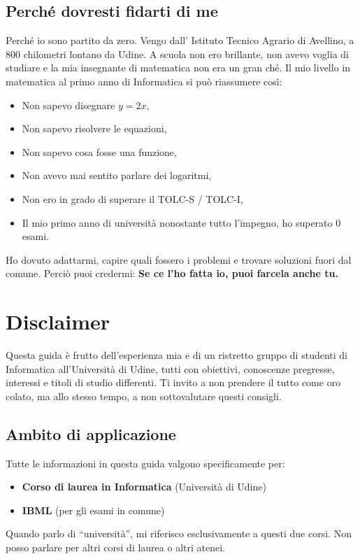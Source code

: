 \documentclass[18pt]{extarticle}
\begin{document}
\subsection{Perché dovresti fidarti di me}
Perché io sono partito da zero.  
Vengo dall' Istituto Tecnico Agrario di Avellino, a 800 chilometri lontano da Udine. 
A scuola non ero brillante, non avevo voglia di studiare e la mia insegnante di matematica non era un gran ché.  
Il mio livello in matematica al primo anno di Informatica si può riassumere così:
\begin{itemize}
\item Non sapevo disegnare $y = 2x$,
\item Non sapevo risolvere le equazioni,
\item Non sapevo cosa fosse una funzione,
\item Non avevo mai sentito parlare dei logaritmi,
\item Non ero in grado di superare il TOLC-S / TOLC-I, 
\item Il mio primo anno di università nonostante tutto l'impegno, ho superato 0 esami. 
\end{itemize}%
Ho dovuto adattarmi, capire quali fossero i problemi e trovare soluzioni fuori dal comune. 
Perciò puoi credermi: \textbf{Se ce l'ho fatta io, puoi farcela anche tu.}

\clearpage
\section{Disclaimer}
Questa guida è frutto dell'esperienza mia e di un ristretto gruppo di studenti di Informatica all'Università di Udine, tutti con obiettivi, conoscenze pregresse, interessi e titoli di studio differenti.
Ti invito a non prendere il tutto come oro colato, ma allo stesso tempo, a non sottovalutare questi consigli.


\subsection{Ambito di applicazione}
Tutte le informazioni in questa guida valgono specificamente per:
\begin{itemize}
    \item \textbf{Corso di laurea in Informatica} (Università di Udine)
    \item \textbf{IBML} (per gli esami in comune)
\end{itemize}
Quando parlo di ``università'', mi riferisco esclusivamente a questi due corsi. Non posso parlare per altri corsi di laurea o altri atenei.
\end{document}
